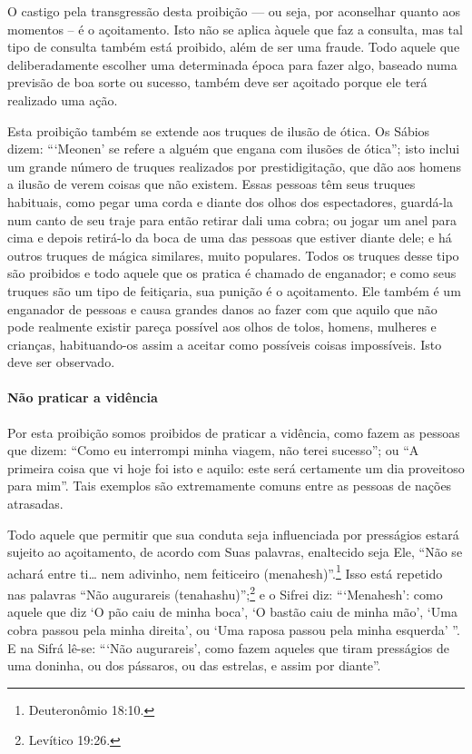 O castigo pela transgressão desta proibição --- ou seja, por aconselhar
quanto aos momentos -- é o açoitamento. Isto não se aplica àquele que
faz a consulta, mas tal tipo de consulta também está proibido, além de
ser uma fraude. Todo aquele que deliberadamente escolher uma determinada
época para fazer algo, baseado numa previsão de boa sorte ou sucesso,
também deve ser açoitado porque ele terá realizado uma ação.

Esta proibição também se extende aos truques de ilusão de ótica. Os
Sábios dizem: ```Meonen' se refere a alguém que engana com ilusões de
ótica''; isto inclui um grande número de truques realizados por
prestidigitação, que dão aos homens a ilusão de verem coisas que não
existem. Essas pessoas têm seus truques habituais, como pegar uma corda
e diante dos olhos dos espectadores, guardá-la num canto de seu traje
para então retirar dali uma cobra; ou jogar um anel para cima e depois
retirá-lo da boca de uma das pessoas que estiver diante dele; e há
outros truques de mágica similares, muito populares. Todos os truques
desse tipo são proibidos e todo aquele que os pratica é chamado de
enganador; e como seus truques são um tipo de feitiçaria, sua punição é
o açoitamento. Ele também é um enganador de pessoas e causa grandes
danos ao fazer com que aquilo que não pode realmente existir pareça
possível aos olhos de tolos, homens, mulheres e crianças, habituando-os assim a
aceitar como possíveis coisas impossíveis. Isto deve ser observado.

\paragraph{Não praticar a vidência}

Por esta proibição somos proibidos de praticar a vidência, como fazem
as pessoas que dizem: ``Como eu interrompi minha viagem, não terei
sucesso''; ou ``A primeira coisa que vi hoje foi isto e aquilo: este
será certamente um dia proveitoso para mim''. Tais exemplos são
extremamente comuns entre as pessoas de nações atrasadas.

Todo aquele que permitir que sua conduta seja influenciada por
presságios estará sujeito ao açoitamento, de acordo com Suas palavras,
enaltecido seja Ele, ``Não se achará entre ti\ldots{} nem adivinho, nem
feiticeiro (menahesh)''.\footnote{Deuteronômio 18:10.} Isso está repetido nas
palavras ``Não augurareis (tenahashu)'';\footnote{Levítico 19:26.} e o Sifrei
diz: ```Menahesh': como aquele que diz `O pão caiu de minha boca', `O
bastão caiu de minha mão', `Uma cobra passou pela minha direita', ou
`Uma raposa passou pela minha esquerda' ''. E na Sifrá lê-se: ```Não
augurareis', como fazem aqueles que tiram presságios de uma doninha, ou
dos pássaros, ou das estrelas, e assim por diante''.

